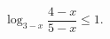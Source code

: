 \begin{ex}[type=inequality]
	\begin{condition}
		$ \log_{3 - x} \dfrac{4 - x}{5 - x}\leqslant1 .$
	\end{condition}
\end{ex}